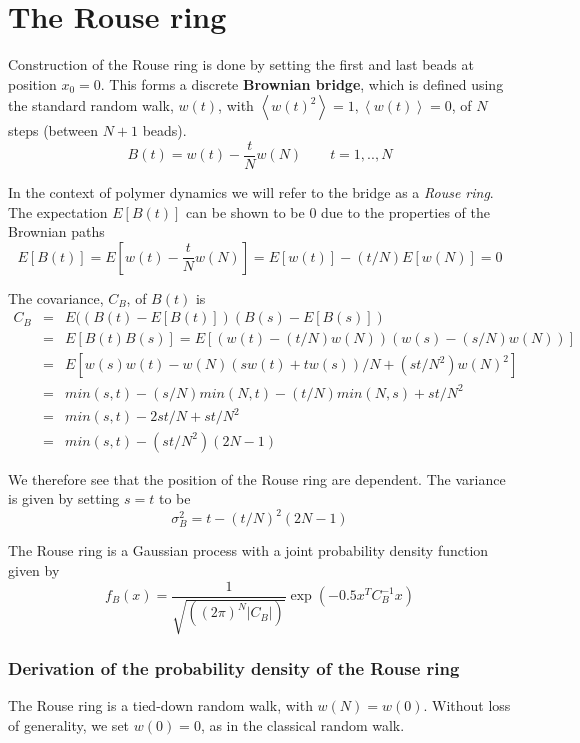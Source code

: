 \documentclass{paper}
\begin{document}
\section{The Rouse ring}\label{section_theRouseRing}
Construction of the Rouse ring is done by setting the first and last beads at position $x_0=0$. This forms a discrete \textbf{Brownian bridge}, which is defined using the standard random walk, $w(t)$, with $\left<w(t)^2\right>=1, \left<w(t)\right>=0$, of $N$ steps (between $N+1$ beads). 
\begin{equation*}
B(t)= w(t)-\frac{t}{N}w(N) \qquad t=1,..,N
\end{equation*} 

In the context of polymer dynamics we will refer to the bridge as a \textit{Rouse ring}. The expectation $E[B(t)]$ can be shown to be 0 due to the properties of the Brownian paths
\begin{equation*}
E[B(t)]=E[w(t)-\frac{t}{N}w(N)]=E[w(t)] -(t/N)E[w(N)]=0
\end{equation*}

The covariance, $C_B$, of $B(t)$ is 
\begin{eqnarray*}
C_{B}  & = & E((B(t)-E[B(t)])(B(s)-E[B(s)])\\
   & = & E[B(t)B(s)]=E[(w(t)-(t/N)w(N))(w(s)-(s/N)w(N))]\\
   & = & E[w(s)w(t)-w(N)(sw(t)+tw(s))/N +(st/N^2)w(N)^2 ]\\
   & = & min(s,t)-(s/N)min(N,t)-(t/N)min(N,s)+st/N^2\\
   & = & min(s,t)-2st/N+st/N^2\\
   & = & min(s,t)-(st/N^2)(2N-1)
\end{eqnarray*}

We therefore see that the position of the Rouse ring are dependent. The variance is given by setting $s=t$ to be 
\begin{equation*}  
\sigma^2_{B}=t-(t/N)^2(2N-1)
\end{equation*}

The Rouse ring is a Gaussian process with a joint probability density function  given by  
\begin{equation*}
f_B(x)=\frac{1}{\sqrt{((2\pi)^N|C_B|)}}\exp(-0.5x^TC_B^{-1}x)
\end{equation*}

\subsubsection{Derivation of the probability density of the Rouse ring}
The Rouse ring is a tied-down random walk, with $w(N)=w(0)$. Without loss of generality, we set $w(0)=0$, as in the classical random walk.
\end{document}
